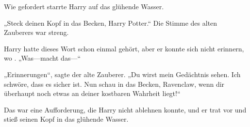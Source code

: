 Wie gefordert starrte Harry auf das glühende Wasser.

„Steck deinen Kopf in das Becken, Harry Potter.“
Die Stimme des alten Zauberers war streng.

Harry hatte dieses Wort schon einmal gehört, aber er konnte sich nicht erinnern, wo . „Was—macht das—“

„Erinnerungen“, sagte der alte Zauberer. „Du wirst mein Gedächtnis sehen. Ich schwöre, dass es sicher ist. Nun schau in das Becken, Ravenclaw, wenn dir überhaupt noch etwas an deiner kostbaren Wahrheit liegt!“

Das war eine Aufforderung, die Harry nicht ablehnen konnte, und er trat vor und stieß seinen Kopf in das glühende Wasser.

\later

